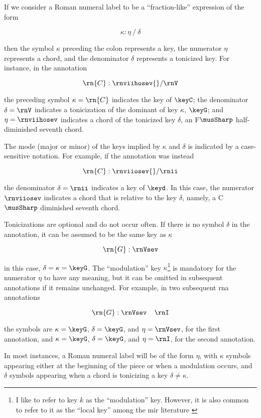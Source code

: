 
If we consider a Roman numeral label to be a
``fraction-like'' expression of the form

\begin{equation}
    \kappa : \eta \: / \: \delta
\end{equation}

then the symbol $\kappa$ preceding the colon represents a
key, the numerator $\eta$ represents a chord, and the
denominator $\delta$ represents a tonicized key. For
instance, in the annotation 

\begin{equation}
    \rn{C}:\rnviihosev{}/\rnV
\end{equation}

the preceding symbol $\kappa=\rn{C}$ indicates the key of
$\keyC$; the denominator $\delta = \rnV$ indicates a
tonicization of the dominant of key $\kappa$, $\keyG$; and
$\eta=\rnviihosev$ indicates a chord of the tonicized key
$\delta$, an F$\musSharp$ half-diminished seventh chord.

The mode (major or minor) of the keys implied by $\kappa$
and $\delta$ is indicated by a case-sensitive notation. For
example, if the annotation was instead

\begin{equation}
    \rn{C}:\rnviiosev{}/\rnii
\end{equation}

the denominator $\delta=\rnii$ indicates a key of $\keyd$.
In this case, the numerator $\rnviiosev$ indicates a chord
that is relative to the key $\delta$, namely, a C$\musSharp$
diminished seventh chord.

Tonicizations are optional and do not occur often. If there
is no symbol $\delta$ in the annotation, it can be assumed
to be the same key as $\kappa$

\begin{equation}
    \rn{G}:\rnVsev
\end{equation}

in this case, $\delta = \kappa = \keyG$. The ``modulation''
key $\kappa$\footnote{I like to refer to key $k$ as the
``modulation'' key. However, it is also common to refer to
it as the ``local key'' among the \gls{mir} literature
\parencite{napoleslopez2020local}} is mandatory for the
numerator $\eta$ to have any meaning, but it can be omitted
in subsequent annotations if it remains unchanged. For
example, in two subsequent \gls{rna} annotations

\begin{equation}
    \rn{G}:\rnVsev \;\;\;\; \rnI
\end{equation}

the symbols are $\kappa=\keyG$, $\delta=\keyG$, and
$\eta=\rnVsev$, for the first annotation, and
$\kappa=\keyG$, $\delta=\keyG$, and $\eta=\rnI$, for the
second annotation.

In most instances, a Roman numeral label will be of the form
$\eta$, with $\kappa$ symbols appearing either at the
beginning of the piece or when a modulation occurs, and
$\delta$ symbols appearing when a chord is tonicizing a key
$\delta \neq \kappa$.
